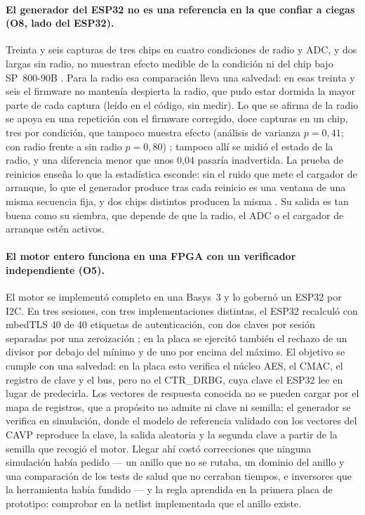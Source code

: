 \paragraph{El generador del ESP32 no es una referencia en la que confiar
a ciegas (O8, lado del ESP32).} Treinta y seis capturas de tres chips en
cuatro condiciones de radio y \ac{ADC}, y dos largas sin radio, no
muestran efecto medible de la condición ni del chip bajo SP~800-90B
\meas{}. Para la radio esa comparación lleva una salvedad: en esas
treinta y seis el firmware no mantenía despierta la radio, que pudo
estar dormida la mayor parte de cada captura (leído en el código, sin
medir). Lo que se afirma de la radio se apoya en una repetición con el
firmware corregido, doce capturas en un chip, tres por condición, que
tampoco muestra efecto (análisis de varianza $p = 0{,}41$; con radio
frente a sin radio $p = 0{,}80$) \meas{}; tampoco allí se midió el
estado de la radio, y una diferencia menor que unos 0,04 pasaría
inadvertida. La prueba de reinicios
enseña lo que la estadística esconde: sin el ruido que mete el cargador de
arranque, lo que el generador produce tras cada reinicio es una ventana
de una misma secuencia fija, y dos chips distintos producen la misma
\meas{}. Su salida es tan buena como
su siembra, que depende de que la radio, el \ac{ADC} o el cargador de
arranque estén activos.

\paragraph{El motor entero funciona en una FPGA con un verificador
independiente (O5).} El motor se implementó completo en una Basys~3 y lo
gobernó un ESP32 por \ac{I2C}. En tres sesiones, con tres
implementaciones distintas, el ESP32 recalculó con mbedTLS 40 de 40
etiquetas de autenticación, con dos claves por sesión separadas por una
zeroización \meas{}; en la placa se ejercitó también el rechazo de un
divisor por debajo del mínimo y de uno por encima del máximo. El
objetivo se cumple con una salvedad: en la placa esto verifica el núcleo
\ac{AES}, el \ac{CMAC}, el registro de clave y el bus, pero no el
CTR\_DRBG, cuya clave el ESP32 lee en lugar de predecirla. Los vectores
de respuesta conocida no se pueden cargar por el mapa de registros, que
a propósito no admite ni clave ni semilla; el generador se verifica en
simulación, donde el modelo de referencia validado con los vectores del
\ac{CAVP} reproduce la clave, la salida aleatoria y la segunda clave a
partir de la semilla que recogió el motor. Llegar ahí costó correcciones que ninguna simulación había
pedido --- un anillo que no se rutaba, un dominio del anillo y una
comparación de los tests de salud que no cerraban tiempos, e inversores
que la herramienta había fundido --- y la regla aprendida en la primera
placa de prototipo: comprobar en la netlist implementada que el anillo
existe.

